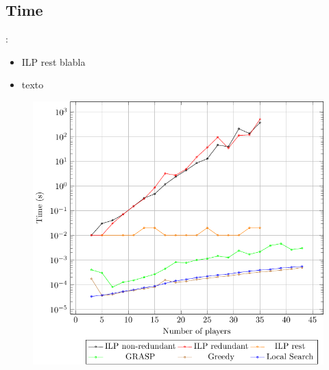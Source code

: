 \documentclass[9pt, aspectratio=169, xcolor=table]{beamer}
\begin{document}
\subsection{Time}
\begin{frame}{\secname: \subsecname}
    \begin{minipage}{0.44\textwidth}
	\begin{itemize}
	    \item ILP rest blabla
	    \item texto
	\end{itemize}
    \end{minipage}
    \hfill
    \begin{minipage}{0.52\textwidth}
	\centering
	\begin{figure}[H]
	    \centering
	    \includegraphics[width=\linewidth]{../plots/times.pdf}
	\end{figure}
    \end{minipage}
\end{frame}
\end{document}
